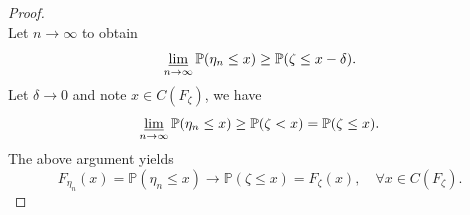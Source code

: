 \documentclass[12pt]{article}
\renewcommand{\(}{\left(}%
\renewcommand{\)}{\right)}%
\renewcommand{\[}{\left[}%
\renewcommand{\]}{\right]}%
\newcommand{\p}{\mathbb{P}}
\newtheorem{proof}{Proof.}}
\begin{document}
\begin{proof}
\begin{equation*}
  	\end{equation*}
  	Let $n\to\infty$ to obtain
  	\begin{equation*}
  		\varliminf_{n\to\infty}\p(\eta_n\leq x)\geq \p(\zeta\leq x-\delta).
  	\end{equation*}
  	Let $\delta\to0$ and note $x\in C(F_\zeta)$, we have
  	\begin{equation*}
  		\varliminf_{n\to\infty}\p(\eta_n\leq x)\geq \p(\zeta<x)=\p(\zeta\leq x).
  	\end{equation*}
  	The above argument yields
  	\begin{equation*}
  		F_{\eta_n}(x)=\p(\eta_n\leq x)\to \p(\zeta\leq x)=F_\zeta(x),\quad \forall x\in C(F_\zeta).
  	\end{equation*}
  \end{proof}
  
\end{document}
